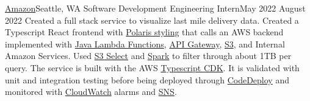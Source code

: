 \resumeSubheading
{\href{https://www.amazon.jobs/en/teams/last-mile}{Amazon}}{Seattle, WA}
{Software Development Engineering Intern}{May 2022 \textemdash August 2022}
\resumeItemListStart
{}
{Created a full stack service to visualize last mile delivery data. Created a Typescript React frontend with \href{https://github.com/Shopify/polaris}{Polaris styling} that calls an AWS backend implemented with \href{https://docs.aws.amazon.com/lambda/latest/dg/lambda-java.html}{Java Lambda Functions}, \href{https://aws.amazon.com/api-gateway/}{API Gateway}, \href{https://aws.amazon.com/s3/}{S3}, and Internal Amazon Services. Used \href{https://docs.aws.amazon.com/AmazonS3/latest/userguide/selecting-content-from-objects.html}{S3 Select} and \href{https://spark.apache.org/}{Spark} to filter through about 1TB per query.}
{The service is built with the AWS \href{https://docs.aws.amazon.com/cdk/v2/guide/work-with-cdk-typescript.html}{Typescript CDK}. It is validated with unit and integration testing before being deployed through \href{https://docs.aws.amazon.com/codedeploy/latest/userguide/welcome.html}{CodeDeploy} and monitored with \href{https://docs.aws.amazon.com/AmazonCloudWatch/latest/monitoring/WhatIsCloudWatch.html}{CloudWatch} alarms and \href{https://aws.amazon.com/sns/}{SNS}.}
\resumeItemListEnd
